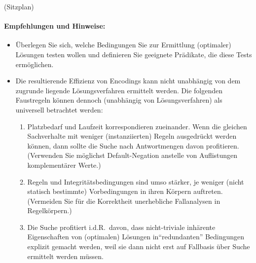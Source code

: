 \documentclass[a4paper,12pt,ngerman]{article}
\begin{document}
\begin{PraktikumsAufgabe}{2}{(Sitzplan)}

\paragraph{Empfehlungen und Hinweise:}\vspace{-2mm}
\begin{itemize}
\item Überlegen Sie sich, welche Bedingungen Sie zur Ermittlung (optimaler) L\"osungen
      testen wollen und definieren Sie geeignete Pr\"adikate, die diese Tests erm\"oglichen.
\item Die resultierende Effizienz von Encodings kann nicht unabhängig von dem
      zugrunde liegende Lösungsverfahren ermittelt werden.
      Die folgenden Faustregeln können dennoch  (unabhängig von Lösungsverfahren) als universell betrachtet werden:
      \vspace{-2mm}
      \begin{enumerate}\itemsep-1pt
      \item Platzbedarf und Laufzeit korrespondieren zueinander.
            Wenn die gleichen Sachverhalte mit weniger (instanziierten) Regeln ausgedrückt werden können,
            dann sollte die Suche nach Antwortmengen davon profitieren.
            (Verwenden Sie möglichst Default-Negation anstelle von Auflistungen komplementärer Werte.)
      \item Regeln und Integritätsbedingungen sind umso stärker, je weniger (nicht statisch bestimmte)
            Vorbedingungen in ihren Körpern auftreten.
            (Vermeiden Sie für die Korrektheit unerhebliche Fallanalysen in Regelkörpern.)
      \item Die Suche profitiert i.d.R.\ davon, dass nicht-triviale inhärente Eigenschaften von (optimalen)
            Lösungen in``redundanten'' Bedingungen explizit gemacht werden, weil sie dann nicht
            erst auf Fallbasis über Suche ermittelt werden müssen.
      \end{enumerate}

\end{itemize}
\end{PraktikumsAufgabe}
\end{document}
